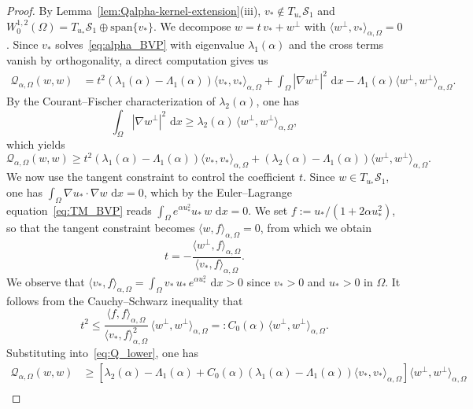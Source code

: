\documentclass[reqno,11pt]{amsart}
\theoremstyle{definition}
\newcommand{\ud}{\,\mathrm{d}}
\begin{document}
\begin{proof}
By Lemma~\ref{lem:Qalpha-kernel-extension}\textup{(iii)},
$v_*\notin T_{u_*}\mathcal{S}_1$ and
$W^{1,2}_0(\Omega)=T_{u_*}\mathcal{S}_1\oplus\mathrm{span}\{v_*\}$.
We decompose $w=t\,v_*+w^\perp$ with
$\langle w^\perp,v_*\rangle_{\alpha,\Omega}=0$.
Since $v_*$ solves~\eqref{eq:alpha_BVP} with eigenvalue $\lambda_1(\alpha)$
and the cross terms vanish by orthogonality, a direct computation gives us
\begin{align*}
\mathscr{Q}_{\alpha,\Omega}(w,w)
&=t^2\left(\lambda_1(\alpha)-\Lambda_1(\alpha)\right)
\langle v_*,v_*\rangle_{\alpha,\Omega}
+\int_\Omega|\nabla w^\perp|^2\,\ud x
-\Lambda_1(\alpha)\langle w^\perp,w^\perp\rangle_{\alpha,\Omega}.
\end{align*}
By the Courant--Fischer characterization of $\lambda_2(\alpha)$, one has
\[
\int_\Omega|\nabla w^\perp|^2\,\ud x
\ge\lambda_2(\alpha)\,\langle w^\perp,w^\perp\rangle_{\alpha,\Omega},
\]
which yields
\begin{equation}\label{eq:Q_lower}
\mathscr{Q}_{\alpha,\Omega}(w,w)
\ge t^2\left(\lambda_1(\alpha)-\Lambda_1(\alpha)\right)
\langle v_*,v_*\rangle_{\alpha,\Omega}
+\left(\lambda_2(\alpha)-\Lambda_1(\alpha)\right)
\langle w^\perp,w^\perp\rangle_{\alpha,\Omega}.
\end{equation}
We now use the tangent constraint to control the coefficient $t$.
Since $w\in T_{u_*}\mathcal{S}_1$, one has
$\int_\Omega\nabla u_*\!\cdot\!\nabla w\,\ud x=0$, which by the
Euler--Lagrange equation~\eqref{eq:TM_BVP} reads
$\int_\Omega e^{\alpha u_*^2}u_*\,w\,\ud x=0$.
We set $f:=u_*/(1+2\alpha u_*^2)$, so that the tangent constraint becomes
$\langle w,f\rangle_{\alpha,\Omega}=0$, from which we obtain
\[
t=-\frac{\langle w^\perp,f\rangle_{\alpha,\Omega}}
{\langle v_*,f\rangle_{\alpha,\Omega}}.
\]
We observe that $\langle v_*,f\rangle_{\alpha,\Omega}
=\int_\Omega v_*\,u_*\,e^{\alpha u_*^2}\,\ud x>0$
since $v_*>0$ and $u_*>0$ in $\Omega$.
It follows from the Cauchy--Schwarz inequality that
\[
t^2\le\frac{\langle f,f\rangle_{\alpha,\Omega}}
{\langle v_*,f\rangle_{\alpha,\Omega}^2}\,
\langle w^\perp,w^\perp\rangle_{\alpha,\Omega}
=:C_0(\alpha)\,\langle w^\perp,w^\perp\rangle_{\alpha,\Omega}.
\]
Substituting into~\eqref{eq:Q_lower}, one has
\begin{align*}
\mathscr{Q}_{\alpha,\Omega}(w,w)
&\ge\left[\lambda_2(\alpha)-\Lambda_1(\alpha)
+C_0(\alpha)\left(\lambda_1(\alpha)-\Lambda_1(\alpha)\right)
\langle v_*,v_*\rangle_{\alpha,\Omega}\right]
\langle w^\perp,w^\perp\rangle_{\alpha,\Omega}\\

\end{align*}
\end{proof}
\end{document}
